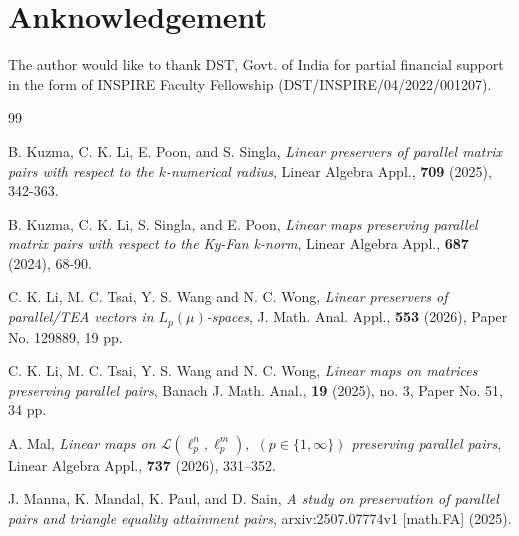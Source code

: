 \documentclass{amsart}
\theoremstyle{definition}
\theoremstyle{remark}
\numberwithin{equation}{section}
\begin{document}
\section{Anknowledgement}
The author would like to thank DST, Govt. of India for partial financial support in the form of INSPIRE Faculty Fellowship (DST/INSPIRE/04/2022/001207).


\begin{thebibliography}{99}

	

	
	 B. Kuzma, C. K. Li, E. Poon, and S. Singla, \textit{Linear preservers of parallel matrix pairs with respect to the $k$-numerical radius}, Linear Algebra Appl., \textbf{709} (2025), 342-363.
	
	 B. Kuzma, C. K. Li, S. Singla, and  E. Poon, \textit{Linear maps preserving parallel matrix pairs with respect to the Ky-Fan k-norm}, Linear Algebra Appl., \textbf{687} (2024), 68-90.
	
	 C. K. Li, M. C. Tsai, Y. S. Wang and N. C. Wong, \textit{Linear preservers of parallel/TEA vectors in $L_p(\mu)$-spaces}, J. Math. Anal. Appl., \textbf{553} (2026), Paper No. 129889, 19 pp.
	
	 C. K. Li, M. C. Tsai, Y. S. Wang and N. C. Wong, \textit{Linear maps on matrices preserving parallel pairs}, Banach J. Math. Anal., \textbf{19} (2025), no. 3, Paper No. 51, 34 pp.
	
		 A. Mal, \textit{Linear maps on $\mathcal{L}(\ell_p^n,\ell_p^m),$ $(p\in \{1,\infty\})$ preserving parallel pairs}, Linear Algebra  Appl., \textbf{737} (2026), 331–352.
	
	
	
	 J. Manna, K. Mandal, K. Paul, and D. Sain, \textit{A study on preservation of parallel pairs and triangle equality attainment pairs}, arxiv:2507.07774v1 [math.FA] (2025).
	

\end{thebibliography}
\end{document}
